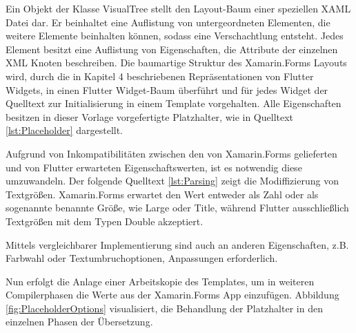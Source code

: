 Ein Objekt der Klasse VisualTree stellt den Layout-Baum einer speziellen XAML Datei dar.  Er beinhaltet eine Auflistung von untergeordneten Elementen,  die weitere Elemente beinhalten können,  sodass eine Verschachtlung entsteht.  Jedes Element besitzt eine Auflistung von Eigenschaften, die Attribute der einzelnen XML Knoten beschreiben.  Die baumartige Struktur des Xamarin.Forms Layouts wird,  durch die in Kapitel 4 beschriebenen Repräsentationen von Flutter Widgets, in einen Flutter Widget-Baum überführt und für jedes Widget der Quelltext zur Initialisierung in einem Template vorgehalten.  Alle Eigenschaften besitzen in dieser Vorlage vorgefertigte Platzhalter, wie in Quelltext \ref{lst:Placeholder} dargestellt.

 

Aufgrund von Inkompatibilitäten zwischen den von Xamarin.Forms gelieferten und von Flutter erwarteten Eigenschaftswerten, ist es notwendig diese umzuwandeln.  Der folgende Quelltext \ref{lst:Parsing} zeigt die Modiffizierung von Textgrößen.  Xamarin.Forms erwartet den Wert entweder als Zahl oder als sogenannte benannte Größe,  wie Large oder Title,  während Flutter ausschließlich Textgrößen mit dem Typen Double akzeptiert.   

 

Mittels vergleichbarer Implementierung sind auch an anderen Eigenschaften, z.B. Farbwahl oder Textumbruchoptionen,  Anpassungen erforderlich.

Nun erfolgt die Anlage einer Arbeitskopie des Templates,  um in weiteren Compilerphasen die Werte aus der Xamarin.Forms App einzufügen.  Abbildung \ref{fig:PlaceholderOptions} visualisiert, die Behandlung der Platzhalter in den einzelnen Phasen der Übersetzung.

